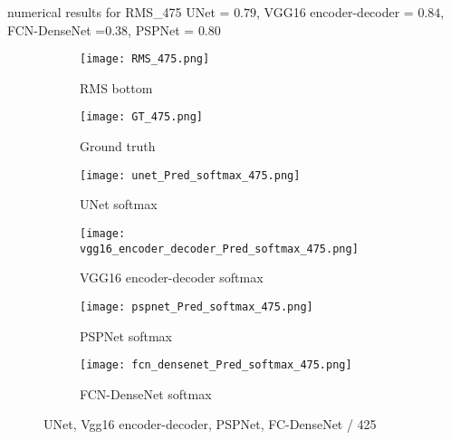 numerical results for RMS\_475
UNet = \(0.79\), VGG16 encoder-decoder = \(0.84\), FCN-DenseNet =\(0.38\), PSPNet = \(0.80\)
	
\begin{figure}[!h]
	\centering
	\begin{subfigure}[b]{0.47\textwidth}
		\centering
		\texttt{[image: RMS\_475.png]}
		\caption{RMS bottom}
		\label{fig:RMS_flat_shell_Vz_475}
	\end{subfigure}
	\hfill
	\begin{subfigure}[b]{0.47\textwidth}
		\centering
		\texttt{[image: GT\_475.png]}
		\caption{Ground truth}
		\label{fig:m1_rand_single_delam_475}
	\end{subfigure}
	\begin{subfigure}[b]{0.47\textwidth}
		\centering
		\texttt{[image: unet\_Pred\_softmax\_475.png]}
		\caption{UNet softmax}
		\label{fig:Unet_Pred__softmax_475}
	\end{subfigure}
	\hfill
	\begin{subfigure}[b]{0.47\textwidth}
		\centering
		\texttt{[image: vgg16\_encoder\_decoder\_Pred\_softmax\_475.png]}
		\caption{VGG16 encoder-decoder softmax}			\label{fig:vgg16_pred__softmax_475}			
	\end{subfigure}
	\hfill
	\begin{subfigure}[b]{0.47\textwidth}
		\centering
		\texttt{[image: pspnet\_Pred\_softmax\_475.png]}
		\caption{PSPNet softmax}
		\label{fig:pspnet_pred__softmax_475}
	\end{subfigure}	
	\hfill
	\begin{subfigure}[b]{0.47\textwidth}
		\centering
		\texttt{[image: fcn\_densenet\_Pred\_softmax\_475.png]}
		\caption{FCN-DenseNet softmax}
		\label{fig:fcn_densenet_pred__softmax_475}
	\end{subfigure}	
	\caption{UNet, Vgg16 encoder-decoder, PSPNet, FC-DenseNet /  425}
	\label{fig:475_softmax}
\end{figure}
